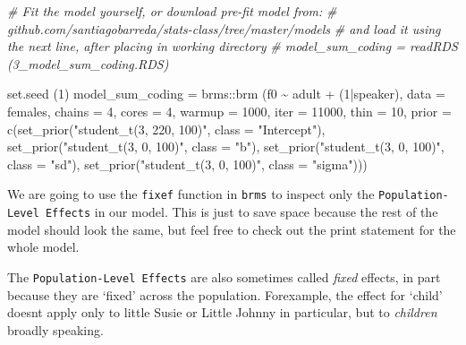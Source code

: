 \documentclass[
]{book}
\newenvironment{Shaded}{\begin{snugshade}}{\end{snugshade}}
\newcommand{\AttributeTok}[1]{\textcolor[rgb]{0.77,0.63,0.00}{#1}}
\newcommand{\CommentTok}[1]{\textcolor[rgb]{0.56,0.35,0.01}{\textit{#1}}}
\newcommand{\DecValTok}[1]{\textcolor[rgb]{0.00,0.00,0.81}{#1}}
\newcommand{\FunctionTok}[1]{\textcolor[rgb]{0.00,0.00,0.00}{#1}}
\newcommand{\NormalTok}[1]{#1}
\newcommand{\OtherTok}[1]{\textcolor[rgb]{0.56,0.35,0.01}{#1}}
\newcommand{\SpecialCharTok}[1]{\textcolor[rgb]{0.00,0.00,0.00}{#1}}
\newcommand{\StringTok}[1]{\textcolor[rgb]{0.31,0.60,0.02}{#1}}
\begin{document}
\begin{Shaded}
\begin{Highlighting}[]
\CommentTok{\# Fit the model yourself, or download pre{-}fit model from: }
\CommentTok{\# github.com/santiagobarreda/stats{-}class/tree/master/models}
\CommentTok{\# and load it using the next line, after placing in working directory}
\CommentTok{\# model\_sum\_coding = readRDS (\textquotesingle{}3\_model\_sum\_coding.RDS\textquotesingle{})}

\FunctionTok{set.seed}\NormalTok{ (}\DecValTok{1}\NormalTok{)}
\NormalTok{model\_sum\_coding }\OtherTok{=}  
\NormalTok{  brms}\SpecialCharTok{::}\FunctionTok{brm}\NormalTok{ (f0 }\SpecialCharTok{\textasciitilde{}}\NormalTok{ adult }\SpecialCharTok{+}\NormalTok{ (}\DecValTok{1}\SpecialCharTok{|}\NormalTok{speaker), }\AttributeTok{data =}\NormalTok{ females, }\AttributeTok{chains =} \DecValTok{4}\NormalTok{, }\AttributeTok{cores =} \DecValTok{4}\NormalTok{,}
       \AttributeTok{warmup =} \DecValTok{1000}\NormalTok{, }\AttributeTok{iter =} \DecValTok{11000}\NormalTok{, }\AttributeTok{thin =} \DecValTok{10}\NormalTok{,}
       \AttributeTok{prior =} \FunctionTok{c}\NormalTok{(}\FunctionTok{set\_prior}\NormalTok{(}\StringTok{"student\_t(3, 220, 100)"}\NormalTok{, }\AttributeTok{class =} \StringTok{"Intercept"}\NormalTok{),}
                 \FunctionTok{set\_prior}\NormalTok{(}\StringTok{"student\_t(3, 0, 100)"}\NormalTok{, }\AttributeTok{class =} \StringTok{"b"}\NormalTok{),}
                 \FunctionTok{set\_prior}\NormalTok{(}\StringTok{"student\_t(3, 0, 100)"}\NormalTok{, }\AttributeTok{class =} \StringTok{"sd"}\NormalTok{),}
                 \FunctionTok{set\_prior}\NormalTok{(}\StringTok{"student\_t(3, 0, 100)"}\NormalTok{, }\AttributeTok{class =} \StringTok{"sigma"}\NormalTok{)))}
\end{Highlighting}
\end{Shaded}

We are going to use the \texttt{fixef} function in \texttt{brms} to inspect only the \texttt{Population-Level\ Effects} in our model. This is just to save space because the rest of the model should look the same, but feel free to check out the print statement for the whole model.

The \texttt{Population-Level\ Effects} are also sometimes called \emph{fixed} effects, in part because they are `fixed' across the population. Forexample, the effect for `child' doesnt apply only to little Susie or Little Johnny in particular, but to \emph{children} broadly speaking.
\end{document}
